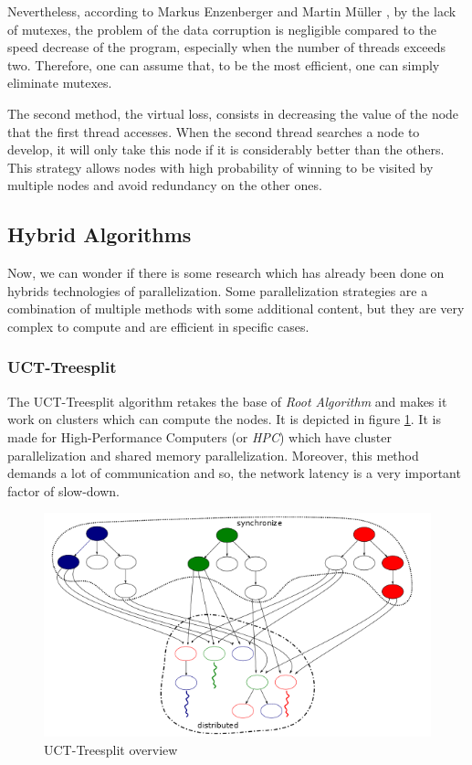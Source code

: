Nevertheless, according to Markus Enzenberger and Martin Müller \cite{lock-free}, by the lack of mutexes, the problem of the data corruption is negligible compared to the speed decrease of the program, especially when the number of threads exceeds two. Therefore, one can assume that, to be the most efficient, one can simply eliminate mutexes.
\newline

The second method, the virtual loss, consists in decreasing the value of the node that the first thread accesses. When the second thread searches a node to develop, it will only take this node if it is considerably better than the others. This strategy allows nodes with high probability of winning to be visited by multiple nodes and avoid redundancy on the other ones.

\subsection{Hybrid Algorithms}

Now, we can wonder if there is some research which has already been done on hybrids technologies of parallelization. Some parallelization strategies are a combination of multiple methods with some additional content, but they are very complex to compute and are efficient in specific cases.


\subsubsection{UCT-Treesplit}

The UCT-Treesplit algorithm\cite{treesplit} retakes the base of \emph{Root Algorithm} and makes it work on clusters which can compute the nodes. %
It is depicted in figure \ref{treesplit}. It is made for High-Performance Computers (or \emph{HPC}) which have cluster parallelization and shared memory parallelization. Moreover, this method demands a lot of communication and so, the network latency is a very important factor of slow-down.

\begin{figure}[!h] 
\centerline{\includegraphics[scale=0.60]{2_State_of_the_art/Strategy_of_root_parallelization_Mikail/treesplit.png}}
   \caption{\label{étiquette} UCT-Treesplit overview}
\label{treesplit}
\end{figure}

